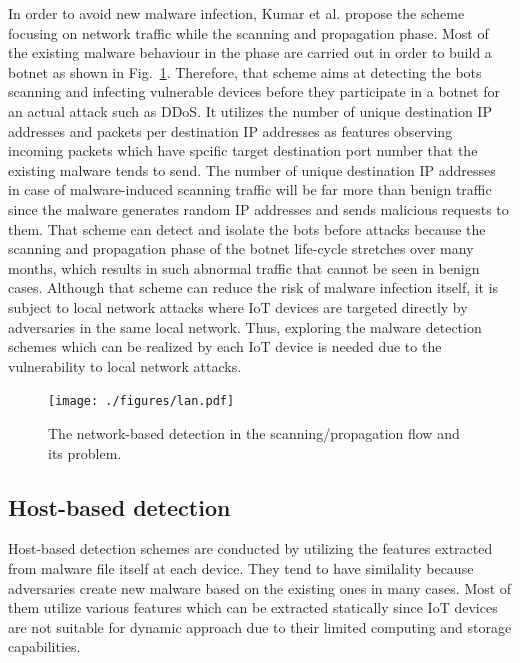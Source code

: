 \documentclass{ieeeaccess}
\newcommand{\myfigurename}{Fig.}
\begin{document}
In order to avoid new malware infection, Kumar et al. \cite{net} propose the scheme focusing on network traffic while the scanning and propagation phase.
Most of the existing malware behaviour in the phase are carried out in order to build a botnet as shown in \myfigurename~\ref{fig:lan}.
Therefore, that scheme aims at detecting the bots scanning and infecting vulnerable devices before they participate in a botnet for an actual attack such as DDoS.
It utilizes the number of unique destination IP addresses and packets per destination IP addresses as features observing incoming packets which have spcific target destination port number that the existing malware tends to send.
The number of unique destination IP addresses in case of malware-induced scanning traffic will be far more than benign traffic since the malware generates random IP addresses and sends malicious requests to them.
That scheme can detect and isolate the bots before attacks because the scanning and propagation phase of the botnet life-cycle stretches over many months, which results in such abnormal traffic that cannot be seen in benign cases.
Although that scheme can reduce the risk of malware infection itself, it is subject to local network attacks where IoT devices are targeted directly by adversaries in the same local network.
Thus, exploring the malware detection schemes which can be realized by each IoT device is needed due to the vulnerability to local network attacks.

\begin{figure}[t]
 \centering
 \texttt{[image: ./figures/lan.pdf]}
 \caption{The network-based detection in the scanning/propagation flow and its problem.} 
 \label{fig:lan}
\end{figure}

\subsection{Host-based detection}
Host-based detection schemes are conducted by utilizing the features extracted from malware file itself at each device.
They tend to have similality because adversaries create new malware based on the existing ones \cite{om, hwang, cfg, cfg2} in many cases.
Most of them utilize various features which can be extracted statically since IoT devices are not suitable for dynamic approach due to their limited computing and storage capabilities.
\end{document}
